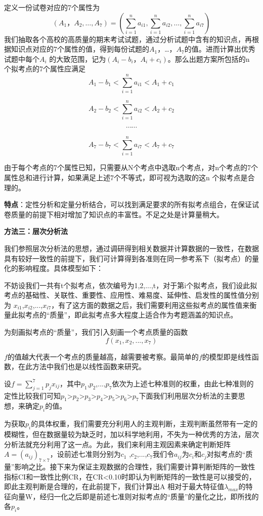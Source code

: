 \documentclass{ctexart}
\begin{document}
定义一份试卷对应的7个属性为$$(A_{1}，A_{2},…,A_{7})=(\sum\limits_{i=1}^{n}a_{i1}, \sum\limits_{i=1}^{n}a_{i2},…, \sum\limits_{i=1}^{n}a_{i7})$$我们抽取各个高校的高质量的期末考试试题，通过分析试题中含有的知识点，再根据知识点对应的7个属性的值，得到每份试题的$A_{1}$，…，$A_{7}$的值。进而计算出优秀试题中每个$A_{i}$ 的大致范围，记为$(A_{i}-b_{i}，A_{i}+c_{i})$。那么出题方案所包括的n 个拟考点的7个属性应满足
$$A_{1}-b_{1}<\sum\limits_{i=1}^{n}a_{i1}<A_{1}+c_{1}$$

$$A_{2}-b_{2}<\sum\limits_{i=1}^{n}a_{i2}<A_{2}+c_{2}$$

$$\cdots  \cdots$$

$$A_{7}-b_{7}<\sum\limits_{i=1}^{n}a_{i7}<A_{7}+c_{7}$$


由于每个考点的7个属性已知，只需要从N个考点中选取n个考点，对n个考点的7个属性总和进行计算，如果满足上述7个不等式，即可视为选取的这n 个拟考点是合理的。

\textbf{特点}：定性分析和定量分析结合，可以找到满足要求的所有拟考点组合，在保证试卷质量的前提下相对增加了知识点的丰富性。不足之处是计算量稍大。


\textbf{方法三：层次分析法}

我们参照层次分析法的思想，通过调研得到相关数据并计算数据的一致性，在数据具有较好一致性的前提下，我们可计算得到各准则在同一参考系下（拟考点）的量化的影响程度。具体模型如下：

不妨设我们一共有t个拟考点，依次编号为1,2,...,t，对于第i个拟考点，我们设此拟考点的基础性、关联性、重要性、应用性、难易度、延伸性、启发性的属性值分别为 $x_{i1}$,$x_{i2}$,...,$x_{i7}$，有了这方面的数据之后，我们需要利用这些拟考点的属性值来衡量此拟考点的“质量”，即此拟考点多大程度上适合作为考题涵盖的知识点。

为刻画拟考点的“质量”，我们引入刻画一个考点质量的函数$$f(x_{1},x_{2},...,x_{7})$$

$f$的值越大代表一个考点的质量越高，越需要被考察。最简单的$f$的模型即是线性函数，在此方法中我们也是以线性函数来研究。

设$f=\sum\limits_{j=1}^{7}p_{j}x_{ij}$，其中$p_{1}$,$p_{2}$,...,$p_{7}$依次为上述七种准则的权重，由此七种准则的定性比较我们可知$p_{1}$>$p_{2}$>$p_{3}$>$p_{4}$>$p_{5}$>$p_{6}$>$p_{7}$下面我们利用层次分析法的主要思想，来确定$p_{i}$的值。

为获取$p_{i}$的具体权重，我们需要充分利用人的主观判断，主观判断虽然带有一定的模糊性，但在数据量较为缺乏时，加以科学地利用，不失为一种优秀的方法，层次分析法就充分利用了这一点。为此，我们来利用主观因素来确定判断矩阵$A=(a_{ij})_{7\times7}$，设前述七准则分别为$c_{1}$ ,$c_{2}$,...,$c_{7}$我们令$a_{ij}$为$c_{i}$和$c_{j}$对拟考点的“质量”影响之比。接下来为保证主观数据的合理性，我们需要计算判断矩阵的一致性指标CI和一致性比例CR，在CR<0.10时即认为判断矩阵的一致性是可以接受的，即此主观判断是合理的，在此前提下，我们计算出A 相对于最大特征值$\lambda_{max}$的特征向量W，经归一化之后即是前述七准则对拟考点的“质量”的量化之比，即所找的各$p_{i}$。
\end{document}
